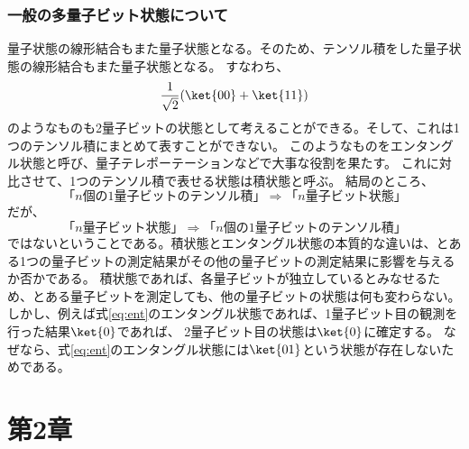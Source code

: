 \documentclass[a4paper,11pt,uplatex]{jsarticle}%
\begin{document}
\subsubsection*{一般の多量子ビット状態について}
量子状態の線形結合もまた量子状態となる。そのため、テンソル積をした量子状態の線形結合もまた量子状態となる。
すなわち、
\begin{equation}
  \frac{1}{\sqrt{2}}(\ket{00}+\ket{11})
  \label{eq:ent}
\end{equation}
のようなものも2量子ビットの状態として考えることができる。そして、これは1つのテンソル積にまとめて表すことができない。
このようなものをエンタングル状態と呼び、量子テレポーテーションなどで大事な役割を果たす。
これに対比させて、1つのテンソル積で表せる状態は積状態と呼ぶ。
結局のところ、
\begin{equation}
  \text{「$n$個の1量子ビットのテンソル積」}\Rightarrow \text{「$n$量子ビット状態」}
\end{equation}
だが、
\begin{equation}
  \text{「$n$量子ビット状態」} \Rightarrow \text{「$n$個の1量子ビットのテンソル積」}
\end{equation}
ではないということである。積状態とエンタングル状態の本質的な違いは、とある1つの量子ビットの測定結果がその他の量子ビットの測定結果に影響を与えるか否かである。
積状態であれば、各量子ビットが独立しているとみなせるため、とある量子ビットを測定しても、他の量子ビットの状態は何も変わらない。
しかし、例えば式\eqref{eq:ent}のエンタングル状態であれば、1量子ビット目の観測を行った結果$\ket{0}$であれば、
2量子ビット目の状態は$\ket{0}$に確定する。
なぜなら、式\eqref{eq:ent}のエンタングル状態には$\ket{01}$という状態が存在しないためである。

\section{第2章}
\end{document}

